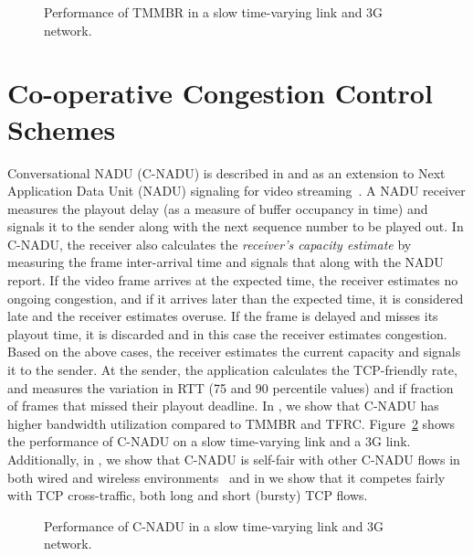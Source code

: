 \begin{figure}
  \centerline{
  }
  \caption{Performance of TMMBR in a slow time-varying link and 3G network.}
  \label{fig:tmmbr}
\end{figure}

\section{Co-operative Congestion Control Schemes}
\label{cc:co-op}

Conversational NADU (C-NADU) is described in  and
 as an extension to Next Application Data Unit (NADU)
signaling for video streaming~\cite{nadu.1070341,nadu.1530486}. A NADU
receiver measures the playout delay (as a measure of buffer occupancy in time)
and signals it to the sender along with the next sequence number to be played
out. In C-NADU, the receiver also calculates the \emph{receiver's capacity
estimate} by measuring the frame inter-arrival time and signals that along
with the NADU report. If the video frame arrives at the expected time, the
receiver estimates no ongoing congestion, and if it arrives later than the
expected time, it is considered late and the receiver estimates overuse. If
the frame is delayed and misses its playout time, it is discarded and in this
case the receiver estimates congestion. Based on the above cases, the receiver
estimates the current capacity and signals it to the sender. At the sender,
the application calculates the TCP-friendly rate, and measures the variation
in RTT (75 and 90 percentile values) and if fraction of frames that missed
their playout deadline. In , we show that C-NADU has higher
bandwidth utilization compared to TMMBR and TFRC. Figure~\ref{fig:cnadu} shows
the performance of C-NADU on a slow time-varying link and a 3G link.
Additionally, in , we show that C-NADU is self-fair with
other C-NADU flows in both wired and wireless
environments~\cite{singh:2010.thesis} and in  we show that it
competes fairly with TCP cross-traffic, both long and short (bursty) TCP
flows.

\begin{figure}
  \centerline{
  }
  \caption{Performance of C-NADU in a slow time-varying link and 3G network.}
  \label{fig:cnadu}
\end{figure}

